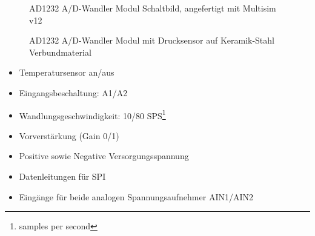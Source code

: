 \documentclass[12pt]{scrreprt} %
\begin{document}
\begin{figure}
\centering
{}
\caption[AD1232 A/D-Wandler Schaltbild]{AD1232 A/D-Wandler Modul Schaltbild, angefertigt mit Multisim v12}
\label{sch.ad1232}
\end{figure}
\begin{figure}
\centering
{}
\caption[AD1232 A/D-Wandler Modul mit Drucksensor]{AD1232 A/D-Wandler Modul mit Drucksensor auf Keramik-Stahl Verbundmaterial}
\label{pic.ad1232}
\end{figure}
\begin{itemize}
\item
Temperatursensor an/aus
\item
Eingangsbeschaltung: A1/A2
\item
Wandlungsgeschwindigkeit: 10/80 SPS\footnote{samples per second}
\item
Vorverstärkung (Gain 0/1)
\item
Positive sowie Negative Versorgungsspannung
\item
Datenleitungen für SPI
\item
Eingänge für beide analogen Spannungsaufnehmer AIN1/AIN2
\end{itemize}
\end{document}
